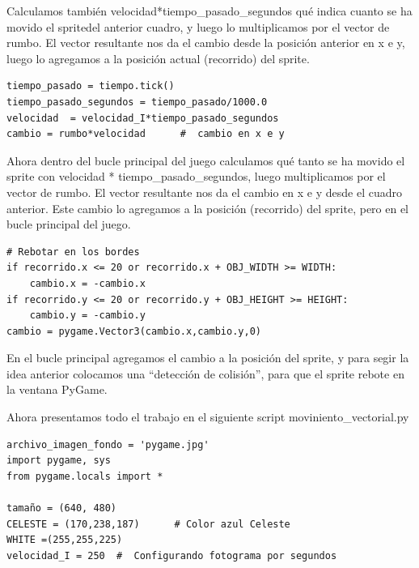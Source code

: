 {Calculamos también {\ttfamily velocidad*tiempo\_pasado\_segundos} qué indica cuanto se ha movido el spritedel anterior cuadro, y
luego lo  multiplicamos por el vector de rumbo. El vector resultante nos da el cambio desde la posición  anterior en {\ttfamily x} e {\ttfamily y}, luego lo agregamos a la posición actual (recorrido) del sprite.



\begin{lstlisting}
tiempo_pasado = tiempo.tick()
tiempo_pasado_segundos = tiempo_pasado/1000.0
velocidad  = velocidad_I*tiempo_pasado_segundos 
cambio = rumbo*velocidad      #  cambio en x e y
\end{lstlisting}

Ahora dentro del bucle principal del juego calculamos qué tanto se ha movido el sprite con velocidad * tiempo\_pasado\_segundos, 
luego multiplicamos por el vector de rumbo. El vector resultante nos da el cambio en x e y desde el cuadro anterior. Este cambio lo agregamos a la posición (recorrido) del sprite, pero en el bucle principal del juego.



\begin{lstlisting}
# Rebotar en los bordes
if recorrido.x <= 20 or recorrido.x + OBJ_WIDTH >= WIDTH:
    cambio.x = -cambio.x       
if recorrido.y <= 20 or recorrido.y + OBJ_HEIGHT >= HEIGHT:
    cambio.y = -cambio.y
cambio = pygame.Vector3(cambio.x,cambio.y,0)
\end{lstlisting}
En el bucle principal agregamos el cambio a la posición del sprite, y para segir la idea anterior colocamos una “detección de colisión”, para que el sprite rebote en la ventana PyGame.

Ahora presentamos todo el trabajo en el siguiente script {moviniento\_vectorial.py}

\hspace{-2.8cm}{\ttfamily \scriptsize movimiento}

\vspace{-0.2cm}
\hspace{-2.4cm}{\ttfamily \scriptsize \_vectorial.py}\vspace{-0.84cm}
\begin{lstlisting} 
archivo_imagen_fondo = 'pygame.jpg'
import pygame, sys
from pygame.locals import *

tamaño = (640, 480)
CELESTE = (170,238,187)      # Color azul Celeste 
WHITE =(255,255,225)
velocidad_I = 250  #  Configurando fotograma por segundos


\end{lstlisting}}
